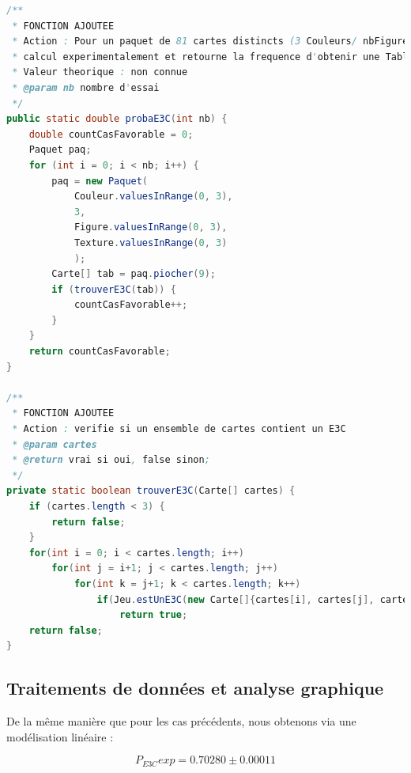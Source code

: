 \documentclass{report}
\begin{document}
\begin{lstlisting}[language=java, caption={\it Fonction probaE3C et trouverE3C}, label=codeProbaE3C]
/**
 * FONCTION AJOUTEE
 * Action : Pour un paquet de 81 cartes distincts (3 Couleurs/ nbFiguresMax=3/ 3 Figures/ 3 Textures possibles par carte) : 
 * calcul experimentalement et retourne la frequence d'obtenir une Table (arrangement de 9 cartes distincts parmi les 81 du Paquet) contenant exactement 3 Cartes Rouges et 2 cartes ayant au moins 1 Losange.
 * Valeur theorique : non connue
 * @param nb nombre d'essai
 */
public static double probaE3C(int nb) {
    double countCasFavorable = 0;
    Paquet paq;
    for (int i = 0; i < nb; i++) {
        paq = new Paquet(
            Couleur.valuesInRange(0, 3), 
            3, 
            Figure.valuesInRange(0, 3), 
            Texture.valuesInRange(0, 3)
            );
        Carte[] tab = paq.piocher(9);
        if (trouverE3C(tab)) {
            countCasFavorable++;
        }    
    }
    return countCasFavorable;
}

/**
 * FONCTION AJOUTEE
 * Action : verifie si un ensemble de cartes contient un E3C
 * @param cartes
 * @return vrai si oui, false sinon;
 */
private static boolean trouverE3C(Carte[] cartes) {
    if (cartes.length < 3) {
        return false;
    }
    for(int i = 0; i < cartes.length; i++)
        for(int j = i+1; j < cartes.length; j++)
            for(int k = j+1; k < cartes.length; k++)
                if(Jeu.estUnE3C(new Carte[]{cartes[i], cartes[j], cartes[k]}))
                    return true;
    return false;
}
\end{lstlisting}


\newpage
\subsection{Traitements de données et analyse graphique}
\noindent De la même manière que pour les cas précédents, nous obtenons via une modélisation linéaire :

$$P_{E3C}exp = 0.70280 \pm 0.00011$$
\end{document}
